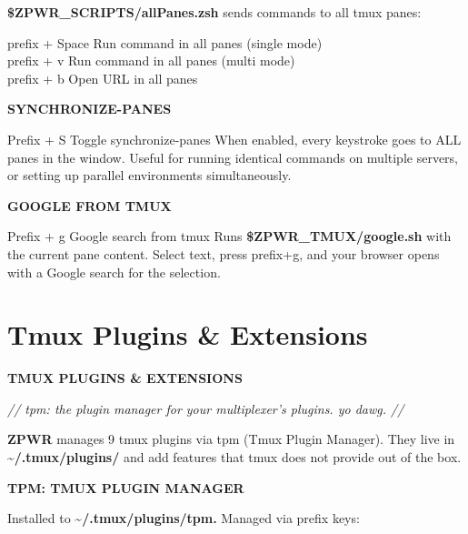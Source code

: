 \documentclass[11pt,a4paper,twoside]{book}
\begin{document}
\textbf{\$ZPWR\_SCRIPTS/allPanes.zsh} sends commands to all tmux panes:

\begin{codebox}
\color{neongreen}prefix + Space   Run command in all panes (single mode)\\
\color{neongreen}prefix + v       Run command in all panes (multi mode)\\
\color{neongreen}prefix + b       Open URL in all panes\\
\end{codebox}


\vspace{12pt}
{\bfseries\color{neonyellow} SYNCHRONIZE-PANES}\vspace{4pt}

Prefix + S   Toggle synchronize-panes When enabled, every keystroke goes to ALL panes in the window. Useful for running identical commands on multiple servers, or setting up parallel environments simultaneously.


\vspace{12pt}
{\bfseries\color{neonyellow} GOOGLE FROM TMUX}\vspace{4pt}

Prefix + g   Google search from tmux Runs \textbf{\$ZPWR\_TMUX/google.sh} with the current pane content. Select text, press prefix+g, and your browser opens with a Google search for the selection.


\vspace{16pt}

\section{Tmux Plugins \& Extensions}


\vspace{10pt}
{\large\bfseries\color{neoncyan} TMUX PLUGINS \& EXTENSIONS}\vspace{6pt}

{\small\itshape\color{dimtext} // tpm: the plugin manager for your multiplexer's plugins. yo dawg. //}

\textbf{ZPWR} manages 9 tmux plugins via tpm (Tmux Plugin Manager). They live in \textbf{\textasciitilde{}/.tmux/plugins/} and add features that tmux does not provide out of the box.


\vspace{12pt}
{\bfseries\color{neonyellow} TPM: TMUX PLUGIN MANAGER}\vspace{4pt}

Installed to \textbf{\textasciitilde{}/.tmux/plugins/tpm.} Managed via prefix keys:
\end{document}
